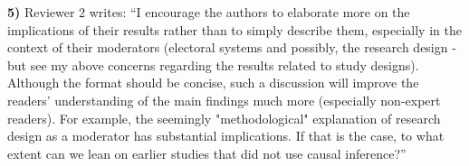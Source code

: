 \documentclass[a4paper,12pt]{article}
\begin{document}
\vspace{.3cm}

\noindent \textbf{5)} Reviewer 2 writes: ``I encourage the authors to elaborate more on the implications of their results rather than to simply describe them, especially in the context of their moderators (electoral systems and possibly, the research design - but see my above concerns regarding the results related to study designs). Although the format should be concise, such a discussion will improve the readers' understanding of the main findings much more (especially non-expert readers). For example, the seemingly "methodological" explanation of research design as a moderator has substantial implications. If that is the case, to what extent can we lean on earlier studies that did not use causal inference?''

\vspace{.3cm}
\end{document}
